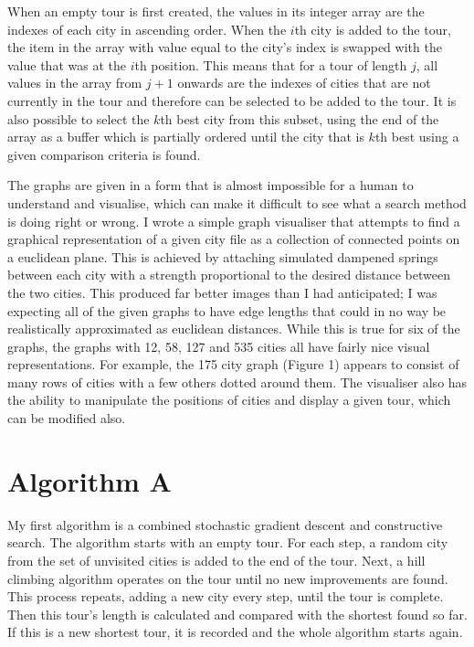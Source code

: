 \documentclass[a4paper,11pt]{article}
\begin{document}
When an empty tour is first created, the values in its integer array are the
indexes of each city in ascending order. When the $i$th city is added to the
tour, the item in the array with value equal to the city's index is swapped
with the value that was at the $i$th position. This means that for a tour of
length $j$, all values in the array from $j+1$ onwards are the indexes of
cities that are not currently in the tour and therefore can be selected to be
added to the tour. It is also possible to select the $k$th best city from this
subset, using the end of the array as a buffer which is partially ordered until
the city that is $k$th best using a given comparison criteria is found.

The graphs are given in a form that is almost impossible for a human to
understand and visualise, which can make it difficult to see what a search
method is doing right or wrong. I wrote a simple graph visualiser that attempts
to find a graphical representation of a given city file as a collection of
connected points on a euclidean plane. This is achieved by attaching simulated
dampened springs between each city with a strength proportional to the desired
distance between the two cities. This produced far better images than I had
anticipated; I was expecting all of the given graphs to have edge lengths that
could in no way be realistically approximated as euclidean distances. While
this is true for six of the graphs, the graphs with 12, 58, 127 and 535 cities
all have fairly nice visual representations. For example, the 175 city graph
(Figure 1) appears to consist of many rows of cities with a few others dotted
around them. The visualiser also has the ability to manipulate the positions of
cities and display a given tour, which can be modified also.

\section{Algorithm A}
My first algorithm is a combined stochastic gradient descent and constructive
search. The algorithm starts with an empty tour. For each step, a random city
from the set of unvisited cities is added to the end of the tour. Next, a
hill climbing algorithm operates on the tour until no new improvements are
found. This process repeats, adding a new city every step, until the tour is
complete. Then this tour's length is calculated and compared with the shortest
found so far. If this is a new shortest tour, it is recorded and the whole
algorithm starts again.
\end{document}
